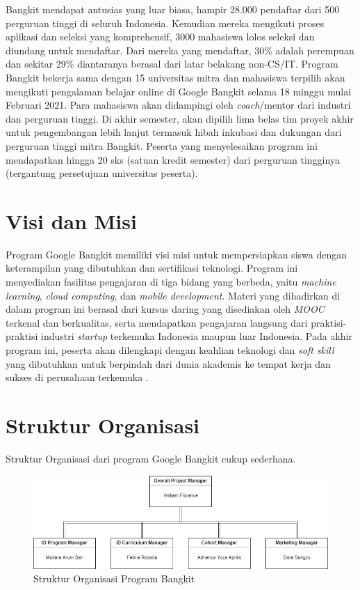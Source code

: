 Bangkit mendapat antusias yang luar biasa, hampir 28.000 pendaftar dari 500 perguruan tinggi di seluruh Indonesia.
Kemudian mereka mengikuti proses aplikasi dan seleksi yang komprehensif, 3000 mahasiswa lolos seleksi dan diundang untuk mendaftar.
Dari mereka yang mendaftar, 30\% adalah perempuan dan sekitar 29\% diantaranya berasal dari latar belakang non-CS/IT.
Program Bangkit bekerja sama dengan 15 universitas mitra dan mahasiswa terpilih akan mengikuti pengalaman belajar online di Google Bangkit selama 18 minggu mulai Februari 2021.
Para mahasiswa akan didampingi oleh \textit{coach}/mentor dari industri dan perguruan tinggi.
Di akhir semester, akan dipilih lima belas tim proyek akhir untuk pengembangan lebih lanjut termasuk hibah inkubasi dan dukungan dari perguruan tinggi mitra Bangkit.
Peserta yang menyelesaikan program ini mendapatkan hingga 20 sks (satuan kredit semester) dari perguruan tingginya (tergantung persetujuan universitas peserta).

\section{Visi dan Misi}

Program Google Bangkit memiliki visi misi untuk mempersiapkan siswa dengan keterampilan yang dibutuhkan dan sertifikasi teknologi.
Program ini menyediakan fasilitas pengajaran di tiga bidang yang berbeda, yaitu \textit{machine learning}, \textit{cloud computing}, dan \textit{mobile development}.
Materi yang dihadirkan di dalam program ini berasal dari kursus daring yang disediakan oleh \textit{MOOC} terkenal dan berkualitas, serta mendapatkan pengajaran langsung dari praktisi-praktisi industri \textit{startup} terkemuka Indonesia maupun luar Indonesia.
Pada akhir program ini, peserta akan dilengkapi dengan keahlian teknologi dan \textit{soft skill} yang dibutuhkan untuk berpindah dari dunia akademis ke tempat kerja dan sukses di perusahaan terkemuka \cite{logo}.

\section{Struktur Organisasi}

Struktur Organisasi dari program Google Bangkit cukup sederhana.

\begin{figure}[ht] \centering
  \includegraphics[scale=0.4]{gambar/struktur-organisasi.png}
  \caption{Struktur Organisasi Program Bangkit}
  \label{fig:strukturOrg}
\end{figure}

